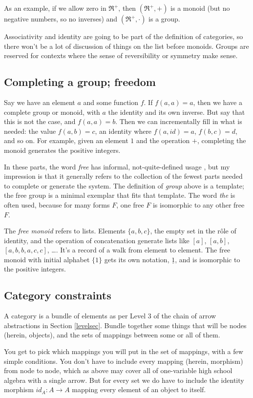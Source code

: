 \documentclass[11pt]{article}
\begin{document}
As an example, if we allow zero in $\Re^+$, then $(\Re^+, +)$ is a monoid (but no
negative numbers, so no inverses) and $(\Re^+, \cdot)$ is a group.

Associativity and identity are going to be part of the definition of categories,
so there won't be a lot of discussion of things on the list before monoids.
Groups are reserved for contexts where the sense of reversibility or symmetry make sense.

\subsection{Completing a group; freedom} Say we have an element $a$ and some function $f$. If
$f(a,a)=a$, then we have a complete group or monoid, with $a$ the identity and its own
inverse.  But say that this is not the case, and $f(a,a)=b$. Then we can incrementally fill in what is
needed: the value $f(a,b)=c$, an identity where $f(a, id)=a$, $f(b,c)=d$, and so on. 
For example, given an element $1$ and the operation $+$, completing the monoid generates
the positive integers.

In these parts, the word {\em free} has informal, not-quite-defined usage
\citep{leinster:basic}, but my impression is that it generally refers to the collection
of the fewest parts needed to complete or generate the system.  The definition of
{\em group} above is a template; the free group is a minimal exemplar that fits that
template. The word {\em the} is often used, because for many forms $F$, one free $F$
is isomorphic to any other free $F$.

The {\em free monoid} refers to lists. Elements $\{a, b, c\}$, the empty set in the r\^ole
of identity,  and the operation
of concatenation generate lists like $[a]$, $[a,b]$, $[a,b,b,a,c,c]$, \dots. It's a
record of a walk from element to element. The free monoid with initial alphabet $\{1\}$
gets its own notation, $\underline 1$, and is isomorphic to the positive integers.

\subsection{Category constraints}
A category is a bundle of elements as per Level 3 of the chain of arrow abstractions
in Section \ref{levelsec}. Bundle together some things that will be nodes (herein,
objects), and the sets of mappings between some or all of them.

You get to pick which mappings you will put in the set of mappings, with a few simple conditions.
You don't have to include every mapping (herein, morphism) from node to node, which as above may cover all of one-variable high school algebra with a single arrow. But for every set we do have to include
the identity morphism $id_A:A\to A$ mapping every element of an object to itself.
\end{document}
